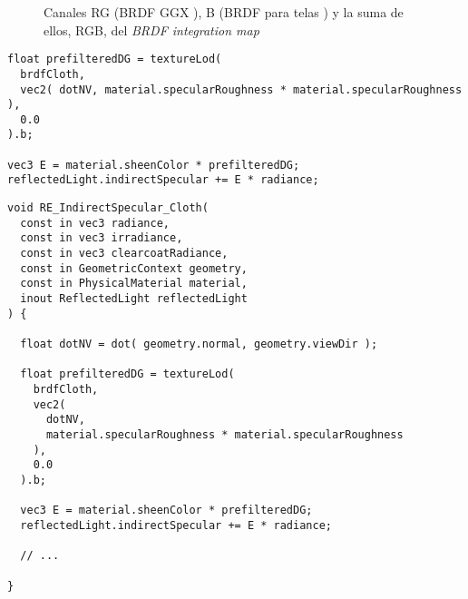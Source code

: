 



      \begin{figure}[H]
        \vspace{0.5cm}
        \centering
        \caption{Canales RG (BRDF GGX \autocite{ggx}), B (BRDF para telas \autocite{filament}) y la suma de ellos,
        RGB, del \textit{BRDF integration map}}
        \vspace{0.5cm}
      \end{figure}

    \begin{lstlisting}[caption=C\'alculo de la irradiancia del entorno para el modelo de telas utilizando el nuevo \textit{BRDF integration map}]
float prefilteredDG = textureLod(
  brdfCloth,
  vec2( dotNV, material.specularRoughness * material.specularRoughness ),
  0.0
).b;

vec3 E = material.sheenColor * prefilteredDG;
reflectedLight.indirectSpecular += E * radiance;
    \end{lstlisting}
    \singlespacing

    \begin{lstlisting}[caption=C\'alculo de iluminaci\'on indirecta de \textit{MeshClothMaterial}]
void RE_IndirectSpecular_Cloth(
  const in vec3 radiance,
  const in vec3 irradiance,
  const in vec3 clearcoatRadiance,
  const in GeometricContext geometry,
  const in PhysicalMaterial material,
  inout ReflectedLight reflectedLight
) {

  float dotNV = dot( geometry.normal, geometry.viewDir );

  float prefilteredDG = textureLod(
    brdfCloth,
    vec2(
      dotNV,
      material.specularRoughness * material.specularRoughness
    ),
    0.0
  ).b;

  vec3 E = material.sheenColor * prefilteredDG;
  reflectedLight.indirectSpecular += E * radiance;

  // ...

}
    \end{lstlisting}
    \singlespacing

